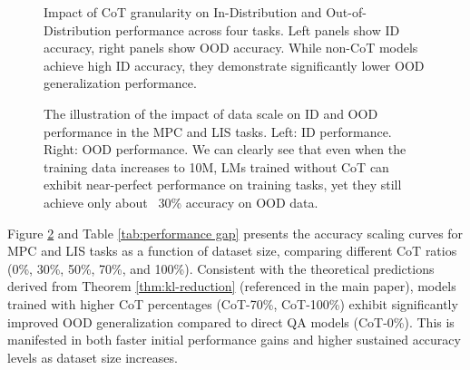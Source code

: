 \begin{figure}
    \centering
    \vfill
    \vspace{-0.5em}
    \vfill
    \vspace{-0.5em}
    \vfill
    \vspace{-0.5em}
    \vspace{-1em}
    \caption{Impact of CoT granularity on In-Distribution and Out-of-Distribution performance across four tasks. Left panels show ID accuracy, right panels show OOD accuracy. While non-CoT models achieve high ID accuracy, they demonstrate significantly lower OOD generalization performance.}
    \vspace{-2em}
    \label{fig:combined}
\end{figure}

\begin{figure}[]
\centering
{}\hfill
{}   
\caption{The illustration of the impact of data scale on ID and OOD performance in the MPC and LIS tasks. Left: ID performance. Right: OOD performance. We can clearly see that even when the training data increases to 10M, LMs trained without CoT can exhibit near-perfect performance on training tasks, yet they still achieve only about ~30\% accuracy on OOD data.}
\label{fig:scaling_results}
\end{figure}

Figure \ref{fig:scaling_results} and Table \ref{tab:performance gap} presents the accuracy scaling curves for MPC and LIS tasks as a function of dataset size, comparing different CoT ratios (0\%, 30\%, 50\%, 70\%, and 100\%).  Consistent with the theoretical predictions derived from Theorem \ref{thm:kl-reduction} (referenced in the main paper), models trained with higher CoT percentages (CoT-70\%, CoT-100\%) exhibit significantly improved OOD generalization compared to direct QA models (CoT-0\%). This is manifested in both faster initial performance gains and higher sustained accuracy levels as dataset size increases.

